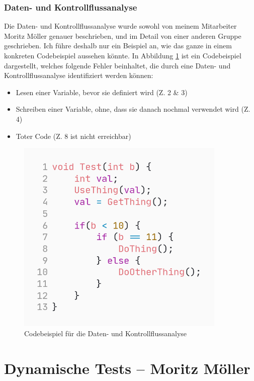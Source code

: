 \documentclass[	%
		fontsize=11pt,  %
		a4paper,	    %
		ngerman,		%
		sans,			%
		f4,				%
	]{HsH-report}		%
\begin{document}
\subsection{Daten- und Kontrollflussanalyse}

Die Daten- und Kontrollflussanalyse wurde sowohl von meinem Mitarbeiter Moritz
Möller genauer beschrieben, und im Detail von einer anderen Gruppe geschrieben.
Ich führe deshalb nur ein Beispiel an, wie das ganze in einem konkreten
Codebeispiel aussehen könnte. In Abbildung \ref{fig:datenfluss} ist ein
Codebeispiel dargestellt, welches folgende Fehler beinhaltet, die durch eine
Daten- und Kontrollflussanalyse identifiziert werden können:

\begin{itemize}
	\item Lesen einer Variable, bevor sie definiert wird (Z. 2 \& 3)
	\item Schreiben einer Variable, ohne, dass sie danach nochmal verwendet wird (Z. 4)
	\item Toter Code (Z. 8 ist nicht erreichbar)
\end{itemize}

\begin{figure}
	\centering
	\includegraphics[width=10cm]{code_example.png}
	\caption{Codebeispiel für die Daten- und Kontrollflussanalyse} \label{fig:datenfluss}
\end{figure}

\chapter{Dynamische Tests -- Moritz Möller} \label{chap: dynamic}

\lipsum[1-30]

\printbibliography
\end{document}
